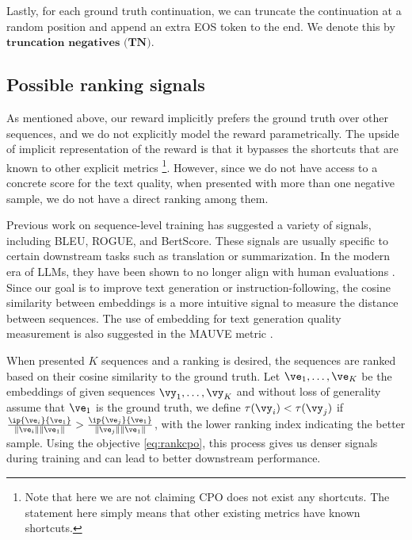 Lastly, for each ground truth continuation, we can truncate the continuation at a random position and append an extra EOS token to the end. We denote this by $\textbf{truncation negatives (TN})$.

\subsection{Possible ranking signals}
As mentioned above, our reward implicitly prefers the ground truth over other sequences, and we do not explicitly model the reward parametrically. 
The upside of implicit representation of the reward is that it bypasses the shortcuts \citep[e.g.][]{krishna2021hurdles} that are known to other explicit metrics \footnote{Note that here we are not claiming CPO does not exist any shortcuts. The statement here simply means that other existing metrics have known shortcuts.}. However, since we do not have access to a concrete score for the text quality, when presented with more than one negative sample, we do not have a direct ranking among them.

Previous work on sequence-level training \citep{liu2022brio,bengio2015scheduled} has suggested a variety of signals, including BLEU, ROGUE, and BertScore. These signals are usually specific to certain downstream tasks such as translation or summarization. In the modern era of LLMs, they have been shown to no longer align with human evaluations \citep{goyal2022news}. Since our goal is to improve text generation or instruction-following, the cosine similarity between embeddings is a more intuitive signal to measure the distance between sequences. The use of embedding for text generation quality measurement is also suggested in the MAUVE metric \citep{pillutla2021mauve}.

When presented $K$ sequences and a ranking is desired, the sequences are ranked based on their cosine similarity to the ground truth. Let $\ve_1,\ldots, \ve_K$ be the embeddings of given sequences $\vy_1,\ldots, \vy_K$ and without loss of generality assume that $\ve_1$ is the ground truth, we define $\tau(\vy_i)<\tau(\vy_j)$ if $\frac{\ip{\ve_i}{\ve_1}}{\|\ve_i\|\|\ve_1\|}>\frac{\ip{\ve_j}{\ve_1}}{\|\ve_j\|\|\ve_1\|}$, with the lower ranking index indicating the better sample. Using the objective \cref{eq:rankcpo}, this process gives us denser signals during training and can lead to better downstream performance.

